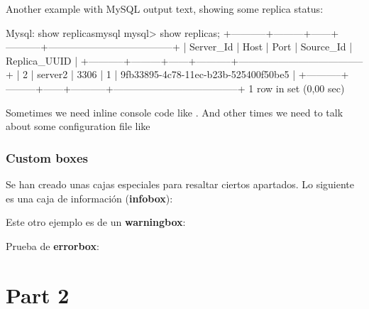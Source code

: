 \documentclass{yukibook}
\begin{document}
Another example with MySQL output text, showing some replica status:

\begin{mycode}{Mysql: show replicas}{mysql}{\footnotesize}
mysql> show replicas;
+-----------+---------+------+-----------+--------------------------------------+
| Server_Id | Host    | Port | Source_Id | Replica_UUID                         |
+-----------+---------+------+-----------+--------------------------------------+
|         2 | server2 | 3306 |         1 | 9fb33895-4c78-11ec-b23b-525400f50be5 |
+-----------+---------+------+-----------+--------------------------------------+
1 row in set (0,00 sec)
\end{mycode}

Sometimes we need inline console code like   . And other times we need to talk about some configuration file like 





\section{Custom boxes}
Se han creado unas cajas especiales para resaltar ciertos apartados. Lo siguiente es una caja de información (\textbf{infobox}):


Este otro ejemplo es de un \textbf{warningbox}:

Prueba de \textbf{errorbox}:



\part{Part 2}
\Blinddocument

\end{document}
